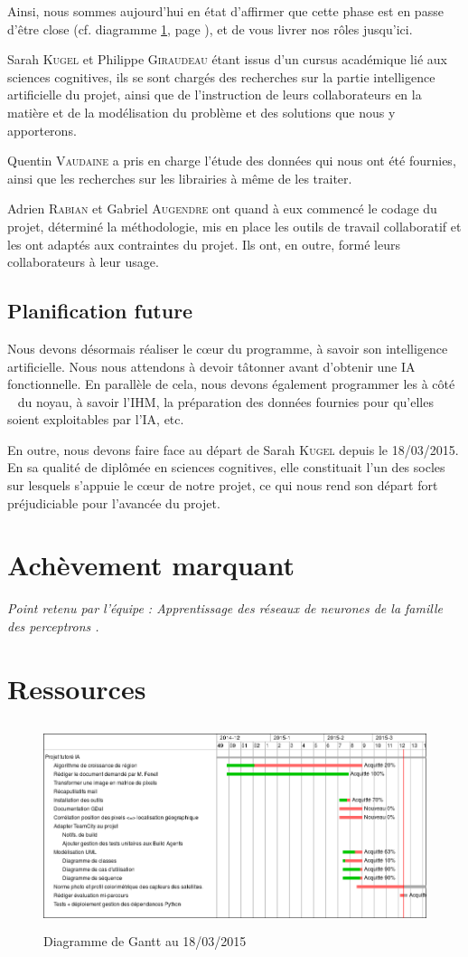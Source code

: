 \documentclass[a4paper, 12pt]{article}
\begin{document}
Ainsi, nous sommes aujourd'hui en état d'affirmer que cette phase est en passe d'être close (cf. diagramme \ref{gantt}, page \pageref{gantt}), et de vous livrer nos rôles jusqu'ici.

Sarah \textsc{Kugel} et Philippe \textsc{Giraudeau} étant issus d'un cursus académique lié aux sciences cognitives, ils se sont chargés des recherches sur la partie intelligence artificielle du projet, ainsi que de l'instruction de leurs collaborateurs en la matière et de la modélisation du problème et des solutions que nous y apporterons.

Quentin \textsc{Vaudaine} a pris en charge l'étude des données qui nous ont été fournies, ainsi que les recherches sur les librairies à même de les traiter.

Adrien \textsc{Rabian} et Gabriel \textsc{Augendre} ont quand à eux commencé le codage du projet, déterminé la méthodologie, mis en place les outils de travail collaboratif et les ont adaptés aux contraintes du projet. Ils ont, en outre, formé leurs collaborateurs à leur usage.

\subsection{Planification future}
Nous devons désormais réaliser le cœur du programme, à savoir son intelligence artificielle. Nous nous attendons à devoir tâtonner avant d'obtenir une IA fonctionnelle. En parallèle de cela, nous devons également programmer les \og à côté \fg ~ du noyau, à savoir l'IHM, la préparation des données fournies pour qu'elles soient exploitables par l'IA, etc.

En outre, nous devons faire face au départ de Sarah \textsc{Kugel} depuis le 18/03/2015. En sa qualité de diplômée en sciences cognitives, elle constituait l'un des socles sur lesquels s'appuie le cœur de notre projet, ce qui nous rend son départ fort préjudiciable pour l'avancée du projet.

\section{Achèvement marquant}
\textsl{Point retenu par l'équipe : \og Apprentissage des réseaux de neurones de la famille des perceptrons \fg.}

\newpage
\appendix
\section{Ressources}
	\begin{figure}
		\begin{center}
			\includegraphics[height=60mm]{gantt.png}
			\newline
			\caption{Diagramme de Gantt au 18/03/2015}
			\label{gantt}
		\end{center}
	\end{figure}
\end{document}
